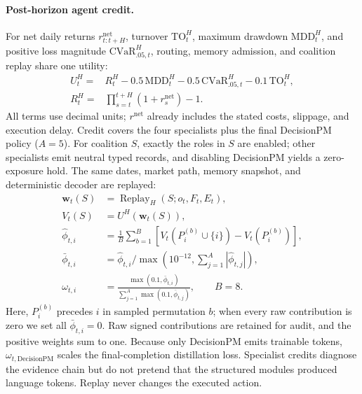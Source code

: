 \paragraph{Post-horizon agent credit.}
For net daily returns $r_{t:t+H}^{\mathrm{net}}$, turnover $\mathrm{TO}_t^H$, maximum drawdown $\mathrm{MDD}_t^H$, and positive loss magnitude $\mathrm{CVaR}_{.05,t}^H$, routing, memory admission, and coalition replay share one utility:
\begin{equation}
\label{eq:utility}
\begin{aligned}
U_t^H={}&R_t^H-0.5\,\mathrm{MDD}_t^H
-0.5\,\mathrm{CVaR}_{.05,t}^H-0.1\,\mathrm{TO}_t^H,\\
R_t^H={}&\prod_{s=t}^{t+H}(1+r_s^{\mathrm{net}})-1.
\end{aligned}
\end{equation}
All terms use decimal units; $r^{\mathrm{net}}$ already includes the stated costs, slippage, and execution delay. Credit covers the four specialists plus the final DecisionPM policy ($A=5$). For coalition $S$, exactly the roles in $S$ are enabled; other specialists emit neutral typed records, and disabling DecisionPM yields a zero-exposure hold. The same dates, market path, memory snapshot, and deterministic decoder are replayed:
\begin{equation}
\label{eq:agent_credit}
\begin{aligned}
\mathbf w_t(S)&=\operatorname{Replay}_H(S;o_t,F_t,E_t),\\
V_t(S)&=U^H(\mathbf w_t(S)),\\
\widehat\phi_{t,i}
&=\frac{1}{B}\sum_{b=1}^{B}
\left[V_t(P_i^{(b)}\cup\{i\})-V_t(P_i^{(b)})\right],\\
\bar\phi_{t,i}&=\widehat\phi_{t,i}/
\max\!\left(10^{-12},\sum_{j=1}^{A}|\widehat\phi_{t,j}|\right),\\
\omega_{t,i}&=
\frac{\max(0.1,\bar\phi_{t,i})}
{\sum_{j=1}^{A}\max(0.1,\bar\phi_{t,j})},
\qquad B=8.
\end{aligned}
\end{equation}
Here, $P_i^{(b)}$ precedes $i$ in sampled permutation $b$; when every raw contribution is zero we set all $\bar\phi_{t,i}=0$. Raw signed contributions are retained for audit, and the positive weights sum to one. Because only DecisionPM emits trainable tokens, $\omega_{t,\mathrm{DecisionPM}}$ scales the final-completion distillation loss. Specialist credits diagnose the evidence chain but do not pretend that the structured modules produced language tokens. Replay never changes the executed action.

